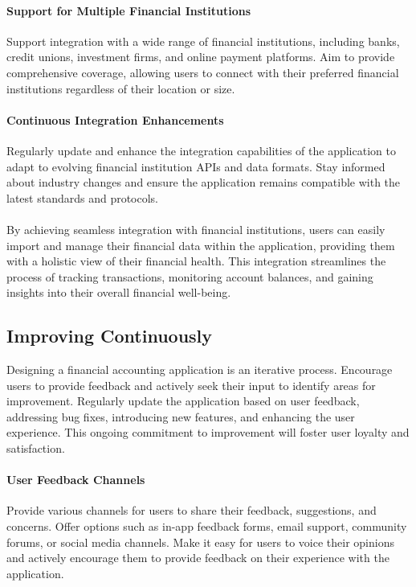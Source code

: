 \paragraph{Support for Multiple Financial Institutions}
Support integration with a wide range of financial institutions, including 
banks, credit unions, investment firms, and online payment platforms. Aim to provide comprehensive coverage, allowing 
users to connect with their preferred financial institutions regardless of their location or size.

\paragraph{Continuous Integration Enhancements}
Regularly update and enhance the integration capabilities of the application to 
adapt to evolving financial institution APIs and data formats. Stay informed about industry changes and ensure the 
application remains compatible with the latest standards and protocols.\\
\\

By achieving seamless integration with financial institutions, users can easily import and manage their financial 
data within the application, providing them with a holistic view of their financial health. This integration streamlines 
the process of tracking transactions, monitoring account balances, and gaining insights into their overall financial 
well-being.


\subsection{Improving Continuously}

Designing a financial accounting application is an iterative process. Encourage users to provide feedback and 
actively seek their input to identify areas for improvement. Regularly update the application based on user 
feedback, addressing bug fixes, introducing new features, and enhancing the user experience. This ongoing 
commitment to improvement will foster user loyalty and satisfaction.

\paragraph{User Feedback Channels}
Provide various channels for users to share their feedback, suggestions, and concerns. Offer options such as in-app 
feedback forms, email support, community forums, or social media channels. Make it easy for users to voice their 
opinions and actively encourage them to provide feedback on their experience with the application.

